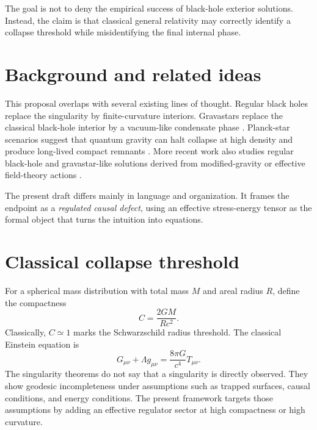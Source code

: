 \documentclass[11pt]{article}
\theoremstyle{remark}
\begin{document}
The goal is not to deny the empirical success of black-hole exterior solutions. Instead, the claim is that classical general relativity may correctly identify a collapse threshold while misidentifying the final internal phase.

\section{Background and related ideas}
This proposal overlaps with several existing lines of thought. Regular black holes replace the singularity by finite-curvature interiors. Gravastars replace the classical black-hole interior by a vacuum-like condensate phase \cite{MazurMottola2001}. Planck-star scenarios suggest that quantum gravity can halt collapse at high density and produce long-lived compact remnants \cite{RovelliVidotto2024}. More recent work also studies regular black-hole and gravastar-like solutions derived from modified-gravity or effective field-theory actions \cite{EichhornFernandes2025,Jampolski2025}.

The present draft differs mainly in language and organization. It frames the endpoint as a \emph{regulated causal defect}, using an effective stress-energy tensor as the formal object that turns the intuition into equations.

\section{Classical collapse threshold}
For a spherical mass distribution with total mass $M$ and areal radius $R$, define the compactness
\begin{equation}
    C = \frac{2GM}{Rc^2}.
\end{equation}
Classically, $C \simeq 1$ marks the Schwarzschild radius threshold. The classical Einstein equation is
\begin{equation}
    G_{\mu\nu} + \Lambda g_{\mu\nu}
    = \frac{8\pi G}{c^4}T_{\mu\nu}.
\end{equation}
The singularity theorems do not say that a singularity is directly observed. They show geodesic incompleteness under assumptions such as trapped surfaces, causal conditions, and energy conditions. The present framework targets those assumptions by adding an effective regulator sector at high compactness or high curvature.
\end{document}
